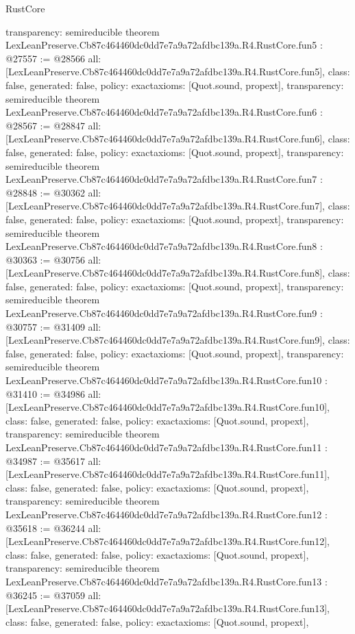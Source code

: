 \begin{lexlean}{RustCore}
\begin{coremodule}
{  transparency: semireducible
}
theorem LexLeanPreserve.Cb87c464460dc0dd7e7a9a72afdbc139a.R4.RustCore.fun5 : @27557 := @28566 {
  all: [LexLeanPreserve.Cb87c464460dc0dd7e7a9a72afdbc139a.R4.RustCore.fun5],
  class: false,
  generated: false,
  policy: exact{axioms: [Quot.sound, propext]},
  transparency: semireducible
}
theorem LexLeanPreserve.Cb87c464460dc0dd7e7a9a72afdbc139a.R4.RustCore.fun6 : @28567 := @28847 {
  all: [LexLeanPreserve.Cb87c464460dc0dd7e7a9a72afdbc139a.R4.RustCore.fun6],
  class: false,
  generated: false,
  policy: exact{axioms: [Quot.sound, propext]},
  transparency: semireducible
}
theorem LexLeanPreserve.Cb87c464460dc0dd7e7a9a72afdbc139a.R4.RustCore.fun7 : @28848 := @30362 {
  all: [LexLeanPreserve.Cb87c464460dc0dd7e7a9a72afdbc139a.R4.RustCore.fun7],
  class: false,
  generated: false,
  policy: exact{axioms: [Quot.sound, propext]},
  transparency: semireducible
}
theorem LexLeanPreserve.Cb87c464460dc0dd7e7a9a72afdbc139a.R4.RustCore.fun8 : @30363 := @30756 {
  all: [LexLeanPreserve.Cb87c464460dc0dd7e7a9a72afdbc139a.R4.RustCore.fun8],
  class: false,
  generated: false,
  policy: exact{axioms: [Quot.sound, propext]},
  transparency: semireducible
}
theorem LexLeanPreserve.Cb87c464460dc0dd7e7a9a72afdbc139a.R4.RustCore.fun9 : @30757 := @31409 {
  all: [LexLeanPreserve.Cb87c464460dc0dd7e7a9a72afdbc139a.R4.RustCore.fun9],
  class: false,
  generated: false,
  policy: exact{axioms: [Quot.sound, propext]},
  transparency: semireducible
}
theorem LexLeanPreserve.Cb87c464460dc0dd7e7a9a72afdbc139a.R4.RustCore.fun10 : @31410 := @34986 {
  all: [LexLeanPreserve.Cb87c464460dc0dd7e7a9a72afdbc139a.R4.RustCore.fun10],
  class: false,
  generated: false,
  policy: exact{axioms: [Quot.sound, propext]},
  transparency: semireducible
}
theorem LexLeanPreserve.Cb87c464460dc0dd7e7a9a72afdbc139a.R4.RustCore.fun11 : @34987 := @35617 {
  all: [LexLeanPreserve.Cb87c464460dc0dd7e7a9a72afdbc139a.R4.RustCore.fun11],
  class: false,
  generated: false,
  policy: exact{axioms: [Quot.sound, propext]},
  transparency: semireducible
}
theorem LexLeanPreserve.Cb87c464460dc0dd7e7a9a72afdbc139a.R4.RustCore.fun12 : @35618 := @36244 {
  all: [LexLeanPreserve.Cb87c464460dc0dd7e7a9a72afdbc139a.R4.RustCore.fun12],
  class: false,
  generated: false,
  policy: exact{axioms: [Quot.sound, propext]},
  transparency: semireducible
}
theorem LexLeanPreserve.Cb87c464460dc0dd7e7a9a72afdbc139a.R4.RustCore.fun13 : @36245 := @37059 {
  all: [LexLeanPreserve.Cb87c464460dc0dd7e7a9a72afdbc139a.R4.RustCore.fun13],
  class: false,
  generated: false,
  policy: exact{axioms: [Quot.sound, propext]},
}
\end{coremodule}
\end{lexlean}
